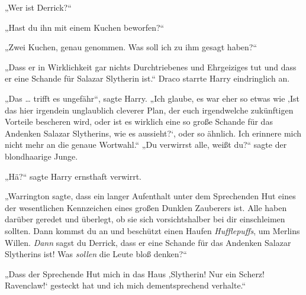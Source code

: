 „Wer ist Derrick?“

„Hast du ihn mit einem Kuchen beworfen?“

„Zwei Kuchen, genau genommen. Was soll ich zu ihm gesagt haben?“

„Dass er in Wirklichkeit gar nichts Durchtriebenes und Ehrgeiziges tut und dass er eine Schande für Salazar Slytherin ist.“ Draco starrte Harry eindringlich an.

„Das … trifft es ungefähr“, sagte Harry.
„Ich glaube, es war eher so etwas wie ‚Ist das hier irgendein unglaublich cleverer Plan, der euch irgendwelche zukünftigen Vorteile bescheren wird, oder ist es wirklich eine so große Schande für das Andenken Salazar Slytherins, wie es aussieht?‘, oder so ähnlich. Ich erinnere mich nicht mehr an die genaue Wortwahl.“
„Du verwirrst alle, weißt du?“ sagte der blondhaarige Junge.

„Hä?“ sagte Harry ernsthaft verwirrt.

„Warrington sagte, dass ein langer Aufenthalt unter dem Sprechenden Hut eines der wesentlichen Kennzeichen eines großen Dunklen Zauberers ist. Alle haben darüber geredet und überlegt, ob sie sich vorsichtshalber bei dir einschleimen sollten. Dann kommst du an und beschützt einen Haufen \emph{Hufflepuffs}, um Merlins Willen. \emph{Dann} sagst du Derrick, dass er eine Schande für das Andenken Salazar Slytherins ist! Was \emph{sollen} die Leute bloß denken?“

„Dass der Sprechende Hut mich in das Haus ‚Slytherin! Nur ein Scherz! Ravenclaw!‘ gesteckt hat und ich mich dementsprechend verhalte.“

